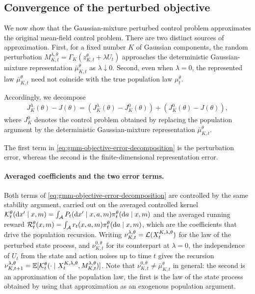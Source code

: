 \subsection{Convergence of the perturbed objective}
\label{subsec:gmm-objective-convergence}

We now show that the Gaussian-mixture perturbed control problem approximates the original mean-field control problem. There are two distinct sources of approximation. First, for a fixed number $K$ of Gaussian components, the random perturbation $M_{K,t}^{\lambda,\theta} = \Gamma_K \left( z_{K,t}^\theta+\lambda U_t \right)$ approaches the deterministic Gaussian-mixture representation $\bar\mu_{K,t}^\theta$ as $\lambda\downarrow0$. Second, even when $\lambda=0$, the represented law $\bar\mu_{K,t}^\theta$ need not coincide with the true population law $\mu_t^\theta$.

Accordingly, we decompose
\begin{align}
    \label{eq:gmm-objective-error-decomposition}
    J_K^\lambda(\theta) - J(\theta) = \left( J_K^\lambda(\theta)-J_K^0(\theta)\right) + \left(J_K^0(\theta)-J(\theta)\right),
\end{align}
where $J_K^0$ denotes the control problem obtained by replacing the population argument by the deterministic Gaussian-mixture representation $\bar\mu_{K,t}^\theta$.

The first term in \eqref{eq:gmm-objective-error-decomposition} is the perturbation error, whereas the second is the finite-dimensional representation error.

\paragraph{Averaged coefficients and the two error terms.}
Both terms of \eqref{eq:gmm-objective-error-decomposition} are controlled by the same stability argument, carried out on the averaged controlled kernel ${\cal K}_t^\theta(\mathrm{d} x'\mid x,m)=\int_{\cal A} P_t(\mathrm{d} x'\mid x,a,m)\pi_t^\theta(\mathrm{d} a\mid x,m)$ and the averaged running reward ${\cal R}_t^\theta(x,m)=\int_{\cal A} r_t(x,a,m)\pi_t^\theta(\mathrm{d} a\mid x,m)$, which are the coefficients that drive the population recursion. Writing $\nu_{K,t}^{\lambda,\theta}={\cal L}(X_t^{K,\lambda,\theta})$ for the law of the perturbed state process, and $\nu_{K,t}^{0,\theta}$ for its counterpart at $\lambda=0$, the independence of $U_t$ from the state and action noises up to time $t$ gives the recursion $\nu_{K,t+1}^{\lambda,\theta}=\mathbb{E}[{\cal K}_t^\theta(\cdot\mid X_t^{K,\lambda,\theta},M_{K,t}^{\lambda,\theta})]$. Note that $\nu_{K,t}^{0,\theta}\neq\bar\mu_{K,t}^\theta$ in general: the second is an approximation of the population law, the first is the law of the state process obtained by using that approximation as an exogenous population argument.

